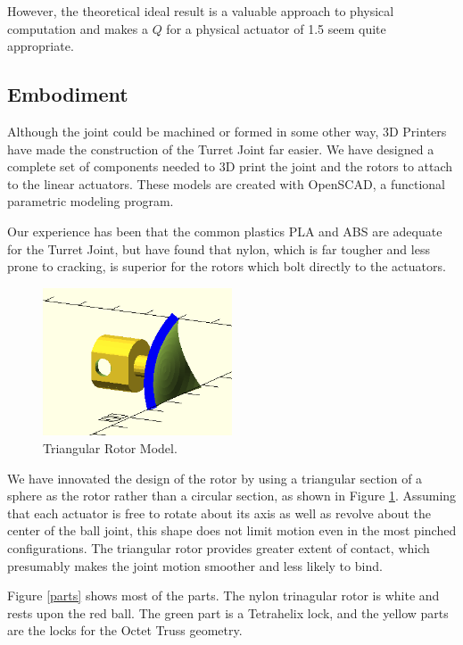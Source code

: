 \documentclass[11pt]{article}
\begin{document}
 However, the theoretical ideal result is a valuable approach to physical computation and makes a $Q$ for a physical actuator of 1.5 seem quite appropriate.

 \subsection{Embodiment}

 Although the joint could be machined or formed in some other way,
 3D Printers have made the construction of the Turret Joint far easier.
 We have designed a complete set of components needed to 3D print the joint and the rotors to attach to
 the linear actuators. These models are created with OpenSCAD, a functional parametric modeling program.

 Our experience has been that the common plastics PLA and ABS are adequate for the Turret Joint,
 but have found that nylon, which is far tougher and less prone to cracking, is superior for the
 rotors which bolt directly to the actuators.

 \begin{figure}[!ht]
  \centering
    \includegraphics[width=0.5\textwidth]{figureslowres/RotorModel.png}
    \caption[Triangular Rotor Model]{Triangular Rotor Model.}
      \label{rotormodel}
\end{figure}

 We have innovated the design of the rotor by using a triangular section of a sphere as the
 rotor rather than a circular section, as shown in Figure \ref{rotormodel}.
 Assuming that each actuator is free to rotate about its axis as well as revolve about the
 center of the ball joint, this shape does not limit motion even in the most pinched
 configurations. The triangular rotor provides greater extent of contact,
 which presumably makes the joint motion
 smoother and less likely to bind.
 

 Figure \ref{parts} shows most of the parts. The nylon trinagular rotor is white and rests upon
 the red ball. The green part is a Tetrahelix lock, and the yellow parts are the locks for the Octet Truss
 geometry.
\end{document}
